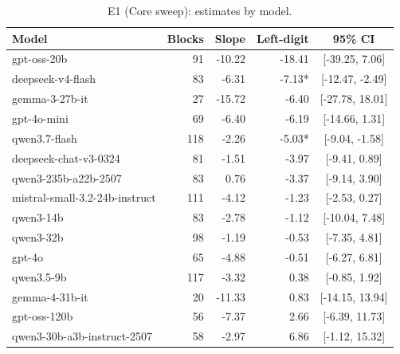 \begin{table}[t]
\centering
\caption{E1 (Core sweep): estimates by model.}
\label{tab:e1model}
\small
\begin{tabular}{lrrrc}
\toprule
Model & Blocks & Slope & Left-digit & 95\% CI \\
\midrule
gpt-oss-20b &  91 & -10.22 & -18.41 & [-39.25, 7.06] \\
deepseek-v4-flash &  83 & -6.31 & -7.13* & [-12.47, -2.49] \\
gemma-3-27b-it &  27 & -15.72 & -6.40 & [-27.78, 18.01] \\
gpt-4o-mini &  69 & -6.40 & -6.19 & [-14.66, 1.31] \\
qwen3.7-flash & 118 & -2.26 & -5.03* & [-9.04, -1.58] \\
deepseek-chat-v3-0324 &  81 & -1.51 & -3.97 & [-9.41, 0.89] \\
qwen3-235b-a22b-2507 &  83 & 0.76 & -3.37 & [-9.14, 3.90] \\
mistral-small-3.2-24b-instruct & 111 & -4.12 & -1.23 & [-2.53, 0.27] \\
qwen3-14b &  83 & -2.78 & -1.12 & [-10.04, 7.48] \\
qwen3-32b &  98 & -1.19 & -0.53 & [-7.35, 4.81] \\
gpt-4o &  65 & -4.88 & -0.51 & [-6.27, 6.81] \\
qwen3.5-9b & 117 & -3.32 & 0.38 & [-0.85, 1.92] \\
gemma-4-31b-it &  20 & -11.33 & 0.83 & [-14.15, 13.94] \\
gpt-oss-120b &  56 & -7.37 & 2.66 & [-6.39, 11.73] \\
qwen3-30b-a3b-instruct-2507 &  58 & -2.97 & 6.86 & [-1.12, 15.32] \\
\bottomrule
\end{tabular}
\end{table}
